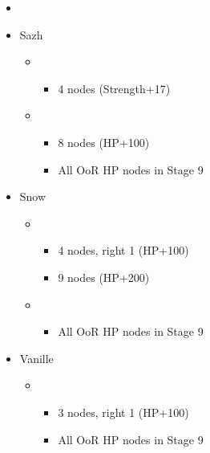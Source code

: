 \begin{menu}
	\begin{itemize}
	\paradigm
		\begin{itemize}
			\item {}%
				{\paradigmline[4]{\com}{\sen}{\med}}%
				{\paradigmline{\com}{\com}{\sab}}%
				{\paradigmline{(\sen)}{\sen}{(\med)}}%
				{\paradigmline{\rav}{\rav}{\rav}}%
				{\paradigmline{\sab}{\sen}{\sab}}%
				{\paradigmline{\rav}{\sen}{\rav}}%
		\end{itemize}
	\crystarium
		\begin{itemize}
			\item Sazh
				\begin{itemize}
					\item \com
						\begin{itemize}
							\item 4 nodes (Strength+17)
						\end{itemize}
					\item \syn
						\begin{itemize}
							\item 8 nodes (HP+100)
							\item All OoR HP nodes in Stage 9
						\end{itemize}
				\end{itemize}
			\item Snow
				\begin{itemize}
					\item \rav
						\begin{itemize}
							\item 4 nodes, right 1 (HP+100)
							\item 9 nodes (HP+200)
						\end{itemize}
					\item \sen
						\begin{itemize}
							\item All OoR HP nodes in Stage 9
						\end{itemize}
				\end{itemize}
			\item Vanille
				\begin{itemize}
					\item \med
						\begin{itemize}
							\item 3 nodes, right 1 (HP+100)
							\item All OoR HP nodes in Stage 9
						\end{itemize}

\end{itemize}
\end{itemize}
\end{itemize}
\end{menu}
